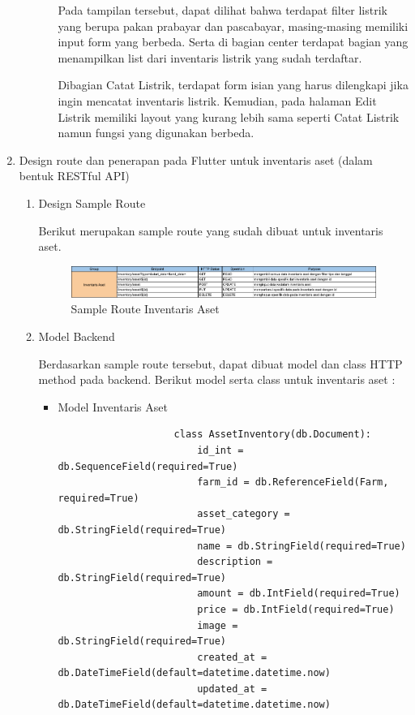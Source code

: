 \begin{spacing}{1.5}
\begin{enumerate}
\begin{enumerate}
\begin{itemize}
				Pada tampilan tersebut, dapat dilihat bahwa terdapat filter listrik yang berupa pakan prabayar dan pascabayar, masing-masing memiliki input form yang berbeda. Serta di bagian center terdapat bagian yang menampilkan list dari inventaris listrik yang sudah terdaftar.

				Dibagian Catat Listrik, terdapat form isian yang harus dilengkapi jika ingin mencatat inventaris listrik. Kemudian, pada halaman Edit Listrik memiliki layout yang kurang lebih sama seperti Catat Listrik namun fungsi yang digunakan berbeda.

				\end{itemize}
		\end{enumerate}
		
		\item Design route dan penerapan pada Flutter untuk inventaris aset (dalam bentuk RESTful API)
		
		\begin{enumerate}
			\item Design Sample Route
			
			Berikut merupakan sample route yang sudah dibuat untuk inventaris aset.

			\begin{figure}[H]
				\centering
				\includegraphics[width=1\textwidth]{gambar/sprint4/samle_route_aset.png}
				\caption{Sample Route Inventaris Aset}
			\end{figure}

			\item Model Backend
 			
			Berdasarkan sample route tersebut, dapat dibuat model dan class HTTP method pada backend. Berikut model serta class untuk inventaris aset :

			\begin{itemize}
				\item Model Inventaris Aset
				
				\begin{lstlisting}
					class AssetInventory(db.Document):
						id_int = db.SequenceField(required=True)
						farm_id = db.ReferenceField(Farm, required=True)
						asset_category = db.StringField(required=True)
						name = db.StringField(required=True)
						description = db.StringField(required=True)
						amount = db.IntField(required=True)
						price = db.IntField(required=True)
						image = db.StringField(required=True)
						created_at = db.DateTimeField(default=datetime.datetime.now)
						updated_at = db.DateTimeField(default=datetime.datetime.now)
				\end{lstlisting}


\end{itemize}
\end{enumerate}
\end{enumerate}
\end{spacing}
